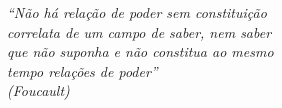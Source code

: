 \begin{epigrafe}
    \vspace*{\fill}
	\begin{flushright}
		\textit{``Não há relação de poder sem constituição \\
			correlata de um campo de saber, nem saber \\
		que não suponha e não constitua ao mesmo \\ tempo relações de poder'' \\ (Foucault)}

	\end{flushright}
\end{epigrafe}
